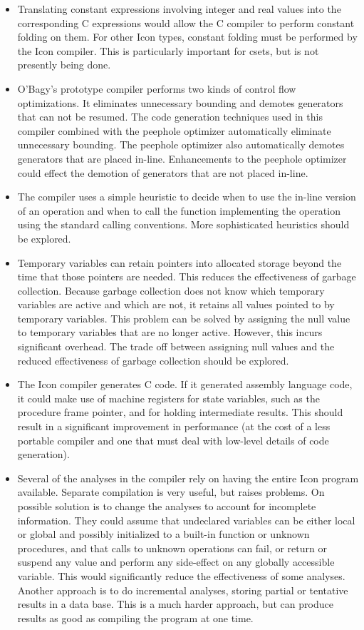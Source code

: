 \begin{itemize}
\item Translating constant expressions involving integer and real
values into the corresponding C expressions would allow the C compiler
to perform constant folding on them. For other Icon types, constant
folding must be performed by the Icon compiler. This is particularly
important for csets, but is not presently being done.

\item O'Bagy's prototype compiler performs two kinds of control flow
optimizations. It eliminates unnecessary bounding and demotes
generators that can not be resumed. The code generation techniques
used in this compiler combined with the peephole optimizer
automatically eliminate unnecessary bounding. The peephole optimizer
also automatically demotes generators that are placed
in-line. Enhancements to the peephole optimizer could effect the
demotion of generators that are not placed in-line.

\item The compiler uses a simple heuristic to decide when to use the
in-line version of an operation and when to call the function
implementing the operation using the standard calling
conventions. More sophisticated heuristics should be explored.

\item Temporary variables can retain pointers into allocated storage
beyond the time that those pointers are needed. This reduces the
effectiveness of garbage collection. Because garbage collection does
not know which temporary variables are active and which are not, it
retains all values pointed to by temporary variables. This problem can
be solved by assigning the null value to temporary variables that are
no longer active. However, this incurs significant overhead.  The
trade off between assigning null values and the reduced effectiveness
of garbage collection should be explored.

\item The Icon compiler generates C code. If it generated assembly
language code, it could make use of machine registers for state
variables, such as the procedure frame pointer, and for holding
intermediate results. This should result in a significant improvement
in performance (at the cost of a less portable compiler and one that
must deal with low-level details of code generation).

\item Several of the analyses in the compiler rely on having the
entire Icon program available. Separate compilation is very useful,
but raises problems. On possible solution is to change the analyses to
account for incomplete information. They could assume that undeclared
variables can be either local or global and possibly initialized to a
built-in function or unknown procedures, and that calls to unknown
operations can fail, or return or suspend any value and perform any
side-effect on any globally accessible variable. This would
significantly reduce the effectiveness of some analyses.  Another
approach is to do incremental analyses, storing partial or tentative
results in a data base. This is a much harder approach, but can
produce results as good as compiling the program at one time.


\end{itemize}
